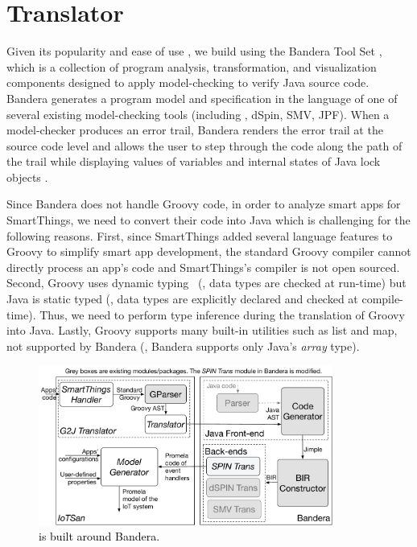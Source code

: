 \chapter{Translator}
\label{sec:translator}
{\color{black}Given its popularity and ease of use \cite{Shankar2018,Godefroid2018,Thomsen2015,Groce2014}}, we build \sys using the Bandera Tool Set \cite{Hatcliff2001,Bandera:intro},
which is a collection of program analysis, transformation, and visualization components designed to apply
model-checking to verify Java source code.
Bandera generates a program model and specification in the language of one of several existing model-checking tools (including \spin, dSpin, SMV, JPF).
When a model-checker produces an error trail, Bandera renders the error trail at the source code level and allows the user to step through the code along the path of the trail while displaying values of variables and internal states of Java lock objects \cite{Hatcliff2001,Bandera:intro}.

Since Bandera %
does not handle Groovy code, in order
to analyze smart apps for SmartThings, we need to convert their code into
Java which is challenging for the following reasons.
First, since SmartThings added several language features to Groovy to simplify smart app development,
the standard Groovy compiler cannot directly process an app's code
and SmartThings's compiler is not open sourced.
Second, Groovy uses dynamic typing~\cite{Groovy:dynamic}
(\ie, data types are checked at run-time) but Java is static typed
(\ie, data types are explicitly declared and checked at compile-time).
Thus, we need to perform type inference during the translation of Groovy into Java.
Lastly, Groovy supports many built-in utilities such as list and map, not supported by Bandera
(\ie, Bandera supports only Java's \textit{array} type).

\begin{figure}[tb]
\begin{center}
\includegraphics[width=3.8in]{IoTSanBanderaRelation}
\caption{\textcolor{black}{\sys is built around Bandera.}}
\label{IoTSanBanderaRelation}
\end{center}
\end{figure}


